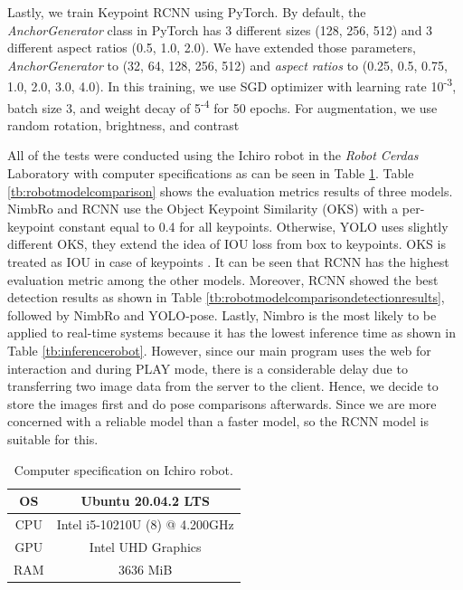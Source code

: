 Lastly, we train Keypoint RCNN using PyTorch. By default, the \emph{AnchorGenerator} class in PyTorch has 3 different sizes (128, 256, 512) and 3 different aspect ratios (0.5, 1.0, 2.0).
We have extended those parameters, \emph{AnchorGenerator} to (32, 64, 128, 256, 512) and \emph{aspect ratios} to (0.25, 0.5, 0.75, 1.0, 2.0, 3.0, 4.0).
In this training, we use SGD optimizer with learning rate 10\textsuperscript{-3}, batch size 3, and weight decay of 5\textsuperscript{-4} for 50 epochs.
For augmentation, we use random rotation, brightness, and contrast

All of the tests were conducted using the Ichiro robot in the \emph{Robot Cerdas} Laboratory with computer specifications as can be seen in Table \ref{tb:computerspecichiro}.
Table \ref{tb:robotmodelcomparison} shows the evaluation metrics results of three models.
NimbRo and RCNN use the Object Keypoint Similarity (OKS) with a per-keypoint constant equal to 0.4 for all keypoints.
Otherwise, YOLO uses slightly different OKS, they extend the idea of IOU loss from box to keypoints. OKS is treated as IOU in case of keypoints \citep{maji2022yolopose}.
It can be seen that RCNN has the highest evaluation metric among the other models.
Moreover, RCNN showed the best detection results as shown in Table \ref{tb:robotmodelcomparisondetectionresults}, followed by NimbRo and YOLO-pose.
Lastly, Nimbro is the most likely to be applied to real-time systems because it has the lowest inference time as shown in Table \ref{tb:inferencerobot}.
However, since our main program uses the web for interaction and during PLAY mode, there is a considerable delay due to transferring two image data from the server to the client.
Hence, we decide to store the images first and do pose comparisons afterwards. Since we are more concerned with a reliable model than a faster model, so the RCNN model is suitable for this.

\begin{table}
\caption{Computer specification on Ichiro robot.}
\centering
    \begin{tabular}{|c|c|}
    \hline
    OS      & Ubuntu 20.04.2 LTS \\
    \hline
    CPU     & Intel i5-10210U (8) @ 4.200GHz \\
    \hline
    GPU     & Intel UHD Graphics  \\
    \hline
    RAM     & 3636 MiB \\
    \hline
    \end{tabular}
    \label{tb:computerspecichiro}
\end{table}

